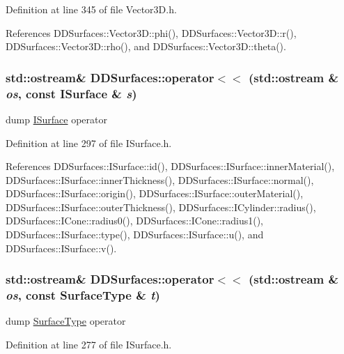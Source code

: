 Definition at line 345 of file Vector3D.h.

References DDSurfaces::Vector3D::phi(), DDSurfaces::Vector3D::r(), DDSurfaces::Vector3D::rho(), and DDSurfaces::Vector3D::theta().\hypertarget{namespace_d_d_surfaces_a13440819dc71cf67cecba8bb55f72726}{
\subsubsection[{operator$<$$<$}]{\setlength{\rightskip}{0pt plus 5cm}std::ostream\& DDSurfaces::operator$<$$<$ (std::ostream \& {\em os}, \/  const ISurface \& {\em s})}}
\label{namespace_d_d_surfaces_a13440819dc71cf67cecba8bb55f72726}


dump \hyperlink{class_d_d_surfaces_1_1_i_surface}{ISurface} operator 

Definition at line 297 of file ISurface.h.

References DDSurfaces::ISurface::id(), DDSurfaces::ISurface::innerMaterial(), DDSurfaces::ISurface::innerThickness(), DDSurfaces::ISurface::normal(), DDSurfaces::ISurface::origin(), DDSurfaces::ISurface::outerMaterial(), DDSurfaces::ISurface::outerThickness(), DDSurfaces::ICylinder::radius(), DDSurfaces::ICone::radius0(), DDSurfaces::ICone::radius1(), DDSurfaces::ISurface::type(), DDSurfaces::ISurface::u(), and DDSurfaces::ISurface::v().\hypertarget{namespace_d_d_surfaces_abb03d1e9cbbd691e8e30c541e5f9df8a}{
\subsubsection[{operator$<$$<$}]{\setlength{\rightskip}{0pt plus 5cm}std::ostream\& DDSurfaces::operator$<$$<$ (std::ostream \& {\em os}, \/  const SurfaceType \& {\em t})}}
\label{namespace_d_d_surfaces_abb03d1e9cbbd691e8e30c541e5f9df8a}


dump \hyperlink{class_d_d_surfaces_1_1_surface_type}{SurfaceType} operator 

Definition at line 277 of file ISurface.h.

